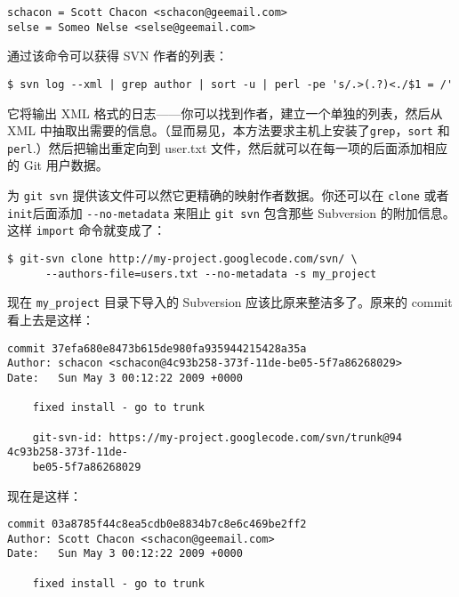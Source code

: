 \documentclass[a4paper]{book}
\begin{document}
\begin{shaded}\begin{verbatim}
schacon = Scott Chacon <schacon@geemail.com>
selse = Someo Nelse <selse@geemail.com>
\end{verbatim}\end{shaded}

通过该命令可以获得 SVN 作者的列表：

\begin{shaded}\begin{verbatim}
$ svn log --xml | grep author | sort -u | perl -pe 's/.>(.?)<./$1 = /'
\end{verbatim}\end{shaded}

它将输出 XML 格式的日志------你可以找到作者，建立一个单独的列表，然后从 XML 中抽取出需要的信息。（显而易见，本方法要求主机上安装了\texttt{grep}，\texttt{sort} 和 \texttt{perl}.）然后把输出重定向到 user.txt 文件，然后就可以在每一项的后面添加相应的 Git 用户数据。

为 \texttt{git svn} 提供该文件可以然它更精确的映射作者数据。你还可以在 \texttt{clone} 或者 \texttt{init}后面添加 \texttt{-{}-no-metadata} 来阻止 \texttt{git svn} 包含那些 Subversion 的附加信息。这样 \texttt{import} 命令就变成了：

\begin{shaded}\begin{verbatim}
$ git-svn clone http://my-project.googlecode.com/svn/ \
      --authors-file=users.txt --no-metadata -s my_project
\end{verbatim}\end{shaded}

现在 \texttt{my\_project} 目录下导入的 Subversion 应该比原来整洁多了。原来的 commit 看上去是这样：

\begin{shaded}\begin{verbatim}
commit 37efa680e8473b615de980fa935944215428a35a
Author: schacon <schacon@4c93b258-373f-11de-be05-5f7a86268029>
Date:   Sun May 3 00:12:22 2009 +0000

    fixed install - go to trunk

    git-svn-id: https://my-project.googlecode.com/svn/trunk@94 4c93b258-373f-11de-
    be05-5f7a86268029
\end{verbatim}\end{shaded}

现在是这样：

\begin{shaded}\begin{verbatim}
commit 03a8785f44c8ea5cdb0e8834b7c8e6c469be2ff2
Author: Scott Chacon <schacon@geemail.com>
Date:   Sun May 3 00:12:22 2009 +0000

    fixed install - go to trunk
\end{verbatim}\end{shaded}
\end{document}
